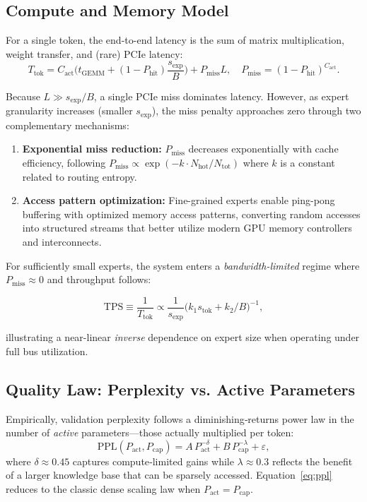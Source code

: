 \documentclass[11pt]{article}
\begin{document}
\subsection{Compute and Memory Model}
For a single token, the end-to-end latency is the sum of matrix multiplication, weight transfer, and (rare) PCIe latency:
\begin{equation}\label{eq:Ttok}
T_{\mathrm{tok}} = C_{\mathrm{act}}\bigl(t_{\mathrm{GEMM}} + (1 - P_{\mathrm{hit}})\frac{s_{\mathrm{exp}}}{B}\bigr) + P_{\mathrm{miss}} L,
\quad P_{\mathrm{miss}} = (1 - P_{\mathrm{hit}})^{C_{\mathrm{act}}}.
\end{equation}

Because $L\gg s_{\mathrm{exp}} / B$, a single PCIe miss dominates latency. However, as expert granularity increases (smaller $s_{\mathrm{exp}}$), the miss penalty approaches zero through two complementary mechanisms:

\begin{enumerate}
  \item \textbf{Exponential miss reduction:} $P_{\mathrm{miss}}$ decreases exponentially with cache efficiency, following $P_{\mathrm{miss}} \propto \exp(-k \cdot N_{\mathrm{hot}}/N_{\mathrm{tot}})$ where $k$ is a constant related to routing entropy.
  \item \textbf{Access pattern optimization:} Fine-grained experts enable ping-pong buffering with optimized memory access patterns, converting random accesses into structured streams that better utilize modern GPU memory controllers and interconnects.
\end{enumerate}

For sufficiently small experts, the system enters a \emph{bandwidth-limited} regime where $P_{\mathrm{miss}} \approx 0$ and throughput follows:

\begin{equation}\label{eq:tps}
\mathrm{TPS} \equiv \frac{1}{T_{\mathrm{tok}}} \propto \frac{1}{s_{\mathrm{exp}}}\bigl(k_1 s_{\mathrm{tok}} + k_2/B\bigr)^{-1},
\end{equation}

illustrating a near-linear \emph{inverse} dependence on expert size when operating under full bus utilization.

\subsection{Quality Law: Perplexity vs. Active Parameters}
Empirically, validation perplexity follows a diminishing‑returns power law in the number of
\emph{active} parameters—those actually multiplied per token:
\begin{equation}\label{eq:ppl}
\mathrm{PPL}(P_{\mathrm{act}}, P_{\mathrm{cap}})
= A\,P_{\mathrm{act}}^{-\delta} + B\,P_{\mathrm{cap}}^{-\lambda} + \varepsilon,
\end{equation}
where $\delta\approx0.45$ captures compute‑limited gains while $\lambda\approx0.3$ reflects the
benefit of a larger knowledge base that can be sparsely accessed. Equation~\eqref{eq:ppl}
reduces to the classic dense scaling law when $P_{\mathrm{act}} = P_{\mathrm{cap}}$.
\end{document}
